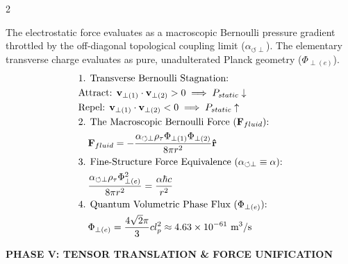 \documentclass[11pt, a4paper]{article}
\newcounter{cheatnum}
\begin{document}
\begin{multicols}{2}
\begin{tcolorbox}[cheatbox, title={\refstepcounter{cheatnum}\label{box:coulomb_bernoulli}\thecheatnum. Coulomb's Law (Spherical Bernoulli \& Phase Flux) \scriptsize\hfill\hyperref[sec:deriv_coulomb_bernoulli]{[Proof $\downarrow$]}}]
The electrostatic force evaluates as a macroscopic Bernoulli pressure gradient throttled by the off-diagonal topological coupling limit ($\alpha_{\circlearrowleft \perp}$). The elementary transverse charge evaluates as pure, unadulterated Planck geometry ($\Phi_{\perp(e)}$).
\begin{align}
    &\text{1. Transverse Bernoulli Stagnation:} \nonumber \\
    &\text{Attract:  } \mathbf{v}_{\perp(1)} \cdot \mathbf{v}_{\perp(2)} > 0 \implies P_{static} \downarrow \label{eq:attraction} \\
    &\text{Repel:  } \mathbf{v}_{\perp(1)} \cdot \mathbf{v}_{\perp(2)} < 0 \implies P_{static} \uparrow \label{eq:repulsion} \\
    &\text{2. The Macroscopic Bernoulli Force ($\mathbf{F}_{fluid}$):} \nonumber \\
    &\quad \mathbf{F}_{fluid} = - \frac{\alpha_{\circlearrowleft \perp} \rho_{\tau} \Phi_{\perp(1)} \Phi_{\perp(2)}}{8\pi r^2} \mathbf{\hat{r}} \label{eq:bernoulli_force} \\
    &\text{3. Fine-Structure Force Equivalence ($\alpha_{\circlearrowleft \perp} \equiv \alpha$):} \nonumber \\
    &\quad \frac{\alpha_{\circlearrowleft \perp} \rho_{\tau} \Phi_{\perp(e)}^2}{8\pi r^2} = \frac{\alpha \hbar c}{r^2} \label{eq:force_equivalence} \\
    &\text{4. Quantum Volumetric Phase Flux ($\Phi_{\perp(e)}$):} \nonumber \\
        &\quad \Phi_{\perp(e)} = \frac{4\sqrt{2}\pi}{3}c \space l_p^2 \approx 4.63 \times 10^{-61} \text{ m}^3/\text{s} \label{eq:charge_flux}
\end{align}
\end{tcolorbox}


\newpage

\vspace{0.4cm}
\noindent\textbf{\large \color{academiabrown} PHASE V: TENSOR TRANSLATION \& FORCE UNIFICATION}
\vspace{0.2cm}




\end{multicols}
\end{document}

